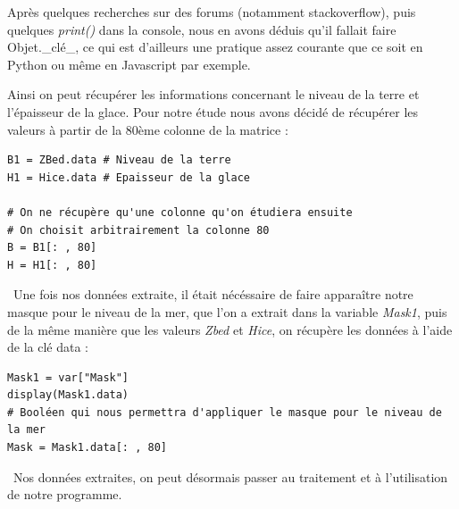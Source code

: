 \documentclass{article}
\begin{document}
Après quelques recherches sur des forums (notamment stackoverﬂow), puis quelques \textit{print()} dans la console, nous en avons déduis qu’il fallait faire Objet.\_clé\_, ce qui est d’ailleurs une pratique assez courante que ce soit en Python ou même en Javascript par exemple.

Ainsi on peut récupérer les informations concernant le niveau de la terre et l’épaisseur de la glace. Pour notre étude nous avons décidé de récupérer les valeurs à partir de la 80ème colonne de la matrice :

\begin{verbatim}
B1 = ZBed.data # Niveau de la terre
H1 = Hice.data # Epaisseur de la glace

# On ne récupère qu'une colonne qu'on étudiera ensuite 
# On choisit arbitrairement la colonne 80
B = B1[: , 80]
H = H1[: , 80]
\end{verbatim}
\
Une fois nos données extraite, il était nécéssaire de faire apparaître notre masque pour le niveau de la mer, que l’on a extrait dans la variable \textit{Mask1}, puis de la même manière que les valeurs \textit{Zbed} et \textit{Hice}, on récupère les données à l’aide de la clé data :
\begin{verbatim}
Mask1 = var["Mask"]
display(Mask1.data)
# Booléen qui nous permettra d'appliquer le masque pour le niveau de la mer
Mask = Mask1.data[: , 80]
\end{verbatim}
\
Nos données extraites, on peut désormais passer au traitement et à l’utilisation de notre programme.

\newpage
\end{document}
